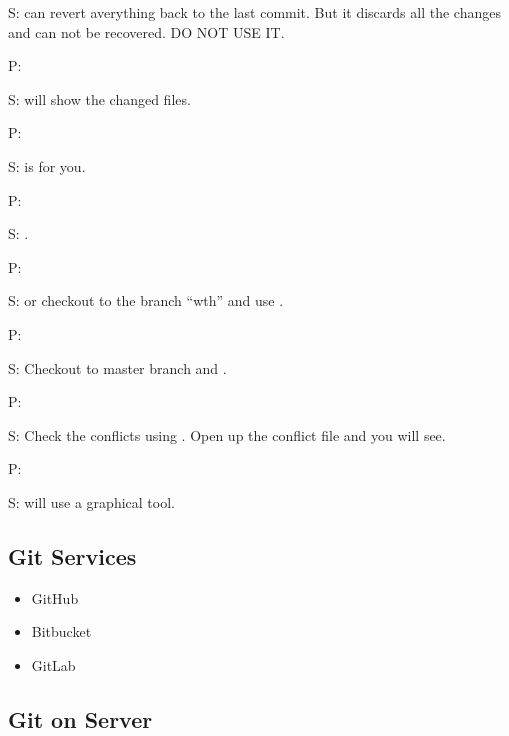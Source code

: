 \documentclass[letterpaper,12pt,english]{sphinxmanual}
\begin{document}
S:   can revert
averything back to the last commit. But it discards all the changes and
can not be recovered. DO NOT USE IT.

P: 

S:  will show the changed files.

P: 

S:  is for you.

P: 

S: .

P: 

S:  or checkout to the branch “wth” and use
.

P: 

S: Checkout to master branch and .

P: 

S: Check the conflicts using . Open up the conflict file
and you will see.

P: 

S:  will use a graphical tool.


\subsection{Git Services}
\label{\detokenize{tools/git:git-services}}\begin{itemize}
\item {} 
GitHub

\item {} 
Bitbucket

\item {} 
GitLab

\end{itemize}


\subsection{Git on Server}
\label{\detokenize{tools/git:git-on-server}}
\end{document}
